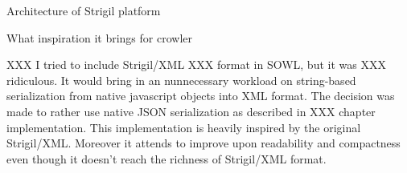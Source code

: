 \secc Architecture of Strigil platform

\secc What inspiration it brings for crowler

XXX I tried to include Strigil/XML XXX format in SOWL, but it was XXX
ridiculous. It would bring in an nunnecessary workload on string-based
serialization from native javascript objects into XML format. The decision was
made to rather use native JSON serialization as described in XXX chapter
implementation. This implementation is heavily inspired by the original
Strigil/XML. Moreover it attends to improve upon readability and compactness
even though it doesn't reach the richness of Strigil/XML format. 

%






